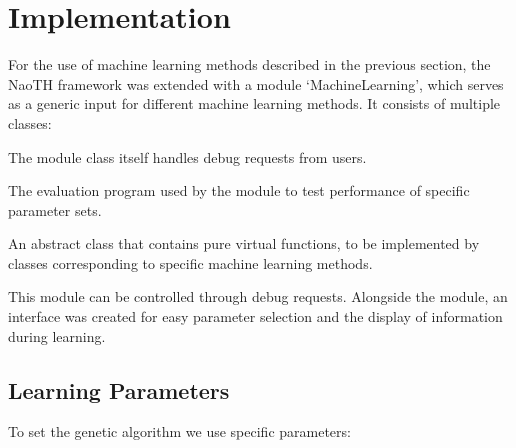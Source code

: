 \documentclass{article}
\begin{document}

\section{Implementation}
For the use of machine learning methods described in the previous section, the NaoTH framework was extended with a module `MachineLearning', which serves as a generic input for different machine learning methods. It consists of multiple classes:

\begin{description}
\setlength{\itemsep}{-2pt}
\item[MachineLearning] The module class itself handles debug requests from users.
\item[LearnToWalk] The evaluation program used by the module to test performance of specific parameter sets.
\item[MachineLearningMethod] An abstract class that contains pure virtual functions, to be implemented by classes corresponding to specific machine learning methods.
\end{description}

This module can be controlled through debug requests. Alongside the module, an interface was created for easy parameter selection and the display of information during learning.

\subsection{Learning Parameters}

To set the genetic algorithm we use specific parameters:
\end{document}
